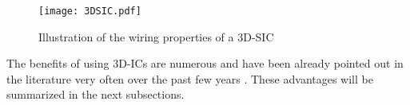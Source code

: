 \begin{figure}[h!]
\begin{center}
\texttt{[image: 3DSIC.pdf]}
\end{center}
\vspace{-0.5cm}
\caption{Illustration of the wiring properties of a 3D-SIC}
\label{fig:3D_SIC_SOC2010}
\end{figure}

The benefits of using 3D-ICs are numerous and have been already pointed out in the literature very often over the past few years \cite{659500}. These advantages will be summarized in the next subsections.



